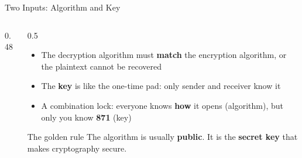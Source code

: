 \documentclass[aspectratio=169,11pt,xcolor={table}]{beamer}
\begin{document}
\begin{frame}{Two Inputs: Algorithm and Key}
  \begin{columns}[c]
    \begin{column}{0.48\textwidth}
      \centering
    \end{column}
    \begin{column}{0.5\textwidth}
      \begin{itemize}\small\setlength{\itemsep}{3pt}
        \item The decryption algorithm must \textbf{match} the encryption algorithm, or the plaintext cannot be recovered
        \item The \textbf{key} is like the one-time pad: only sender and receiver know it
        \item A combination lock: everyone knows \textbf{how} it opens (algorithm), but only you know \textbf{871} (key)
      \end{itemize}
      \begin{alertblock}{The golden rule}
        \small The algorithm is usually \textbf{public}. It is the \textbf{secret key} that makes cryptography secure.
      \end{alertblock}
    \end{column}
  \end{columns}
\end{frame}
\end{document}
